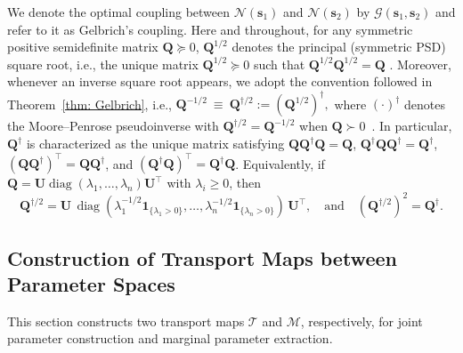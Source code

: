 \documentclass[opre,sglanonrev]{informs4}
\DeclareMathOperator{\diag}{diag}
\newcommand{\mT}{\mathcal{T}}
\newcommand{\mN}{\mathcal{N}}
\newcommand{\mG}{\mathcal{G}}
\newcommand{\mM}{\mathcal{M}}
\newcommand{\bs}{\bm{s}}
\newcommand{\bQ}{\bm Q}
\newcommand{\bU}{\bm{U}}
\begin{document}
We denote the optimal coupling between $\mN(\bs_1)$ and $\mN(\bs_2)$ by $\mG(\bs_1,\bs_2)$ and refer to it as Gelbrich's coupling. 
Here and throughout, for any symmetric positive semidefinite matrix $\bQ\succeq 0$, $\bQ^{1/2}$ denotes the principal (symmetric PSD) square root, i.e., the unique matrix $\bQ^{1/2}\succeq 0$ such that $\bQ^{1/2}\bQ^{1/2}=\bQ$ \cite{bhatia2009positive}.
Moreover, whenever an inverse square root appears, we adopt the convention followed in Theorem~\ref{thm: Gelbrich}, i.e., $\bQ^{-1/2}\ \equiv\ \bQ^{\dagger/2}:=(\bQ^{1/2})^\dagger,$ where $(\cdot)^\dagger$ denotes the Moore--Penrose pseudoinverse with $\bQ^{\dagger/2}=\bQ^{-1/2}$ when $\bQ\succ 0$~\cite{Moore1920, Penrose1955}. In particular, $\bQ^\dagger$ is characterized as the unique matrix satisfying
$\bQ \bQ^\dagger \bQ = \bQ$, $\bQ^\dagger \bQ \bQ^\dagger = \bQ^\dagger$, $(\bQ \bQ^\dagger)^\top = \bQ \bQ^\dagger$, and $(\bQ^\dagger \bQ)^\top = \bQ^\dagger \bQ$.
Equivalently, if $\bQ=\bU\diag(\lambda_1,\ldots,\lambda_n)\bU^\top$ with $\lambda_i\ge 0$, then
\[
\bQ^{\dagger/2}=\bU\,\diag(\lambda_1^{-1/2}\mathbf{1}_{\{\lambda_1>0\}},\ldots,\lambda_n^{-1/2}\mathbf{1}_{\{\lambda_n>0\}})\,\bU^\top, \quad \text{and} \quad (\bQ^{\dagger/2})^2=\bQ^\dagger.
\]



\subsection{Construction of Transport Maps between Parameter Spaces}\label{sec: map-construct}
This section constructs two transport maps $\mT$ and $\mM$, respectively, for joint parameter construction and marginal parameter extraction.
\end{document}
